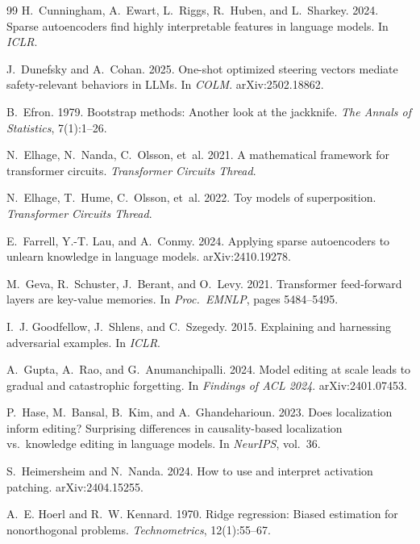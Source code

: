 \documentclass[11pt,twocolumn]{article}
\begin{document}
\begin{thebibliography}{99}
 H.~Cunningham, A.~Ewart, L.~Riggs, R.~Huben, and L.~Sharkey. 2024. Sparse autoencoders find highly interpretable features in language models. In \textit{ICLR}.

 J.~Dunefsky and A.~Cohan. 2025. One-shot optimized steering vectors mediate safety-relevant behaviors in LLMs. In \textit{COLM}. arXiv:2502.18862.

 B.~Efron. 1979. Bootstrap methods: Another look at the jackknife. \textit{The Annals of Statistics}, 7(1):1--26.

 N.~Elhage, N.~Nanda, C.~Olsson, et~al. 2021. A mathematical framework for transformer circuits. \textit{Transformer Circuits Thread}.

 N.~Elhage, T.~Hume, C.~Olsson, et~al. 2022. Toy models of superposition. \textit{Transformer Circuits Thread}.

 E.~Farrell, Y.-T. Lau, and A.~Conmy. 2024. Applying sparse autoencoders to unlearn knowledge in language models. arXiv:2410.19278.

 M.~Geva, R.~Schuster, J.~Berant, and O.~Levy. 2021. Transformer feed-forward layers are key-value memories. In \textit{Proc.\ EMNLP}, pages 5484--5495.

 I.~J. Goodfellow, J.~Shlens, and C.~Szegedy. 2015. Explaining and harnessing adversarial examples. In \textit{ICLR}.

 A.~Gupta, A.~Rao, and G.~Anumanchipalli. 2024. Model editing at scale leads to gradual and catastrophic forgetting. In \textit{Findings of ACL 2024}. arXiv:2401.07453.

 P.~Hase, M.~Bansal, B.~Kim, and A.~Ghandeharioun. 2023. Does localization inform editing? Surprising differences in causality-based localization vs.\ knowledge editing in language models. In \textit{NeurIPS}, vol.~36.

 S.~Heimersheim and N.~Nanda. 2024. How to use and interpret activation patching. arXiv:2404.15255.

 A.~E. Hoerl and R.~W. Kennard. 1970. Ridge regression: Biased estimation for nonorthogonal problems. \textit{Technometrics}, 12(1):55--67.


\end{thebibliography}
\end{document}
